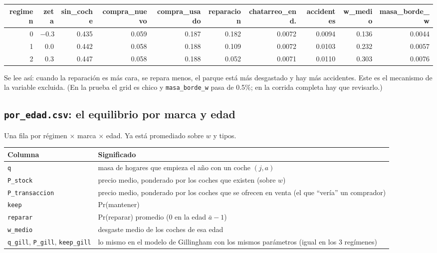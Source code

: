 \documentclass[11pt]{article}
\newcommand{\col}[1]{\texttt{#1}}
\newcommand{\archivo}[1]{\textbf{\texttt{#1}}}
\begin{document}
\begin{center}\footnotesize
\begin{adjustbox}{max width=\textwidth}\begin{tabular}{rrrrrrrrrr}
\toprule
regimen & zeta & sin\_coche & compra\_nuevo & compra\_usado & reparacion & chatarreo\_end. & accidentes & w\_medio & masa\_borde\_w\\
\midrule
0 & $-0.3$ & 0.435 & 0.059 & 0.187 & 0.182 & 0.0072 & 0.0094 & 0.136 & 0.0044\\
1 & $0.0$ & 0.442 & 0.058 & 0.188 & 0.109 & 0.0072 & 0.0103 & 0.232 & 0.0057\\
2 & $0.3$ & 0.447 & 0.058 & 0.188 & 0.052 & 0.0071 & 0.0110 & 0.303 & 0.0076\\
\bottomrule
\end{tabular}\end{adjustbox}
\end{center}
Se lee así: cuando la reparación es más cara, se repara menos, el parque está más desgastado
y hay más accidentes. Este es el mecanismo de la variable excluida. (En la prueba el grid es
chico y \col{masa\_borde\_w} pasa de 0.5\%; en la corrida completa hay que revisarlo.)

\subsection{\archivo{por\_edad.csv}: el equilibrio por marca y edad}

Una fila por régimen $\times$ marca $\times$ edad. Ya está promediado sobre $w$ y tipos.

\begin{center}\small
\begin{adjustbox}{max width=\textwidth}\begin{tabular}{p{3.3cm}p{11.5cm}}
\toprule
Columna & Significado\\
\midrule
\col{q} & masa de hogares que empieza el año con un coche $(j,a)$\\
\col{P\_stock} & precio medio, ponderado por los coches que existen (sobre $w$)\\
\col{P\_transaccion} & precio medio, ponderado por los coches que se ofrecen en venta (el que ``vería'' un comprador)\\
\col{keep} & Pr(mantener)\\
\col{reparar} & Pr(reparar) promedio (0 en la edad $\bar a-1$)\\
\col{w\_medio} & desgaste medio de los coches de esa edad\\
\col{q\_gill}, \col{P\_gill}, \col{keep\_gill} & lo mismo en el modelo de Gillingham con los mismos parámetros (igual en los 3 regímenes)\\
\bottomrule
\end{tabular}\end{adjustbox}
\end{center}
\end{document}
